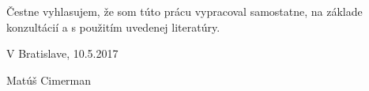 

\vspace*{\fill}

Čestne vyhlasujem, že som túto prácu vypracoval samostatne, na základe konzultácií a s použitím uvedenej literatúry.

V Bratislave, 10.5.2017
\par
\begin{flushright}
	Matúš Cimerman
\end{flushright}


